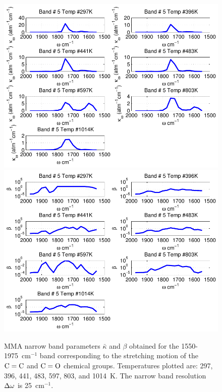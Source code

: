\begin{figure}[p]
\begin{center}
\includegraphics[width=5.0in]{Figures/MMA_Kappa_Band5_MALKMUS.pdf}
\includegraphics[width=5.0in]{Figures/MMA_Beta_Band5_MALKMUS.pdf}
\end{center}
\caption{MMA narrow band parameters $\bar{\kappa}$ and $\beta$ obtained for the 1550-1975~cm$^{-1}$ band corresponding to the stretching motion of the $\rm C=C$ and $\rm C=O$ chemical groups. Temperatures plotted are: 297, 396, 441, 483, 597, 803, and 1014~K. The narrow band resolution $\Delta \omega$ is 25~cm$^{-1}$.\label{fig:MMA_kappa_beta5}}
\end{figure}

